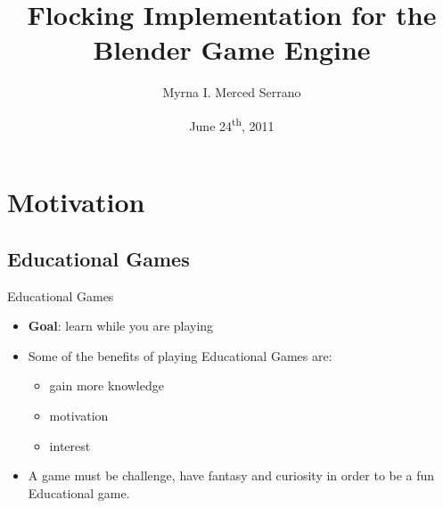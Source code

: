 \documentclass[red]{beamer}
\title[Flocking Implementation for the Blender Game Engine]{Flocking Implementation for the Blender Game Engine}
\author{Myrna I. Merced Serrano}
\institute{\textbf{Adviser:} Dr. Gordon Erlebacher}
\date{June 24\textsuperscript{th}, 2011}
\begin{document}
\begin{frame}
	\titlepage
\end{frame}

\begin{frame}
	\tableofcontents
\end{frame}

\section{Motivation}

\subsection{Educational Games}
\begin{frame}{Educational Games}
	\begin{itemize}
		\pause \item \textbf{Goal}: learn while you are playing
		\pause \item Some of the benefits of playing Educational Games are:
			\begin{itemize}
				\pause \item gain more knowledge
				\pause \item motivation
				\pause \item interest
			\end{itemize}
		\pause \item A game must be challenge, have fantasy and curiosity in order to be a fun Educational game.
	\end{itemize}	
\end{frame}

\end{document}
